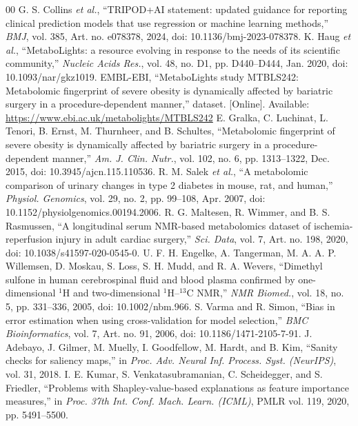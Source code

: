 \documentclass[conference]{IEEEtran}
\begin{document}
\begin{thebibliography}{00}
 G. S. Collins \textit{et al.}, ``TRIPOD+AI statement: updated guidance for reporting clinical prediction models that use regression or machine learning methods,'' \textit{BMJ}, vol. 385, Art. no. e078378, 2024, doi: 10.1136/bmj-2023-078378.
 K. Haug \textit{et al.}, ``MetaboLights: a resource evolving in response to the needs of its scientific community,'' \textit{Nucleic Acids Res.}, vol. 48, no. D1, pp. D440--D444, Jan. 2020, doi: 10.1093/nar/gkz1019.
 EMBL-EBI, ``MetaboLights study MTBLS242: Metabolomic fingerprint of severe obesity is dynamically affected by bariatric surgery in a procedure-dependent manner,'' dataset. [Online]. Available: \url{https://www.ebi.ac.uk/metabolights/MTBLS242}
 E. Gralka, C. Luchinat, L. Tenori, B. Ernst, M. Thurnheer, and B. Schultes, ``Metabolomic fingerprint of severe obesity is dynamically affected by bariatric surgery in a procedure-dependent manner,'' \textit{Am. J. Clin. Nutr.}, vol. 102, no. 6, pp. 1313--1322, Dec. 2015, doi: 10.3945/ajcn.115.110536.
 R. M. Salek \textit{et al.}, ``A metabolomic comparison of urinary changes in type 2 diabetes in mouse, rat, and human,'' \textit{Physiol. Genomics}, vol. 29, no. 2, pp. 99--108, Apr. 2007, doi: 10.1152/physiolgenomics.00194.2006.
 R. G. Maltesen, R. Wimmer, and B. S. Rasmussen, ``A longitudinal serum NMR-based metabolomics dataset of ischemia-reperfusion injury in adult cardiac surgery,'' \textit{Sci. Data}, vol. 7, Art. no. 198, 2020, doi: 10.1038/s41597-020-0545-0.
 U. F. H. Engelke, A. Tangerman, M. A. A. P. Willemsen, D. Moskau, S. Loss, S. H. Mudd, and R. A. Wevers, ``Dimethyl sulfone in human cerebrospinal fluid and blood plasma confirmed by one-dimensional $^1$H and two-dimensional $^1$H--$^{13}$C NMR,'' \textit{NMR Biomed.}, vol. 18, no. 5, pp. 331--336, 2005, doi: 10.1002/nbm.966.
 S. Varma and R. Simon, ``Bias in error estimation when using cross-validation for model selection,'' \textit{BMC Bioinformatics}, vol. 7, Art. no. 91, 2006, doi: 10.1186/1471-2105-7-91.
 J. Adebayo, J. Gilmer, M. Muelly, I. Goodfellow, M. Hardt, and B. Kim, ``Sanity checks for saliency maps,'' in \textit{Proc. Adv. Neural Inf. Process. Syst. (NeurIPS)}, vol. 31, 2018.
 I. E. Kumar, S. Venkatasubramanian, C. Scheidegger, and S. Friedler, ``Problems with Shapley-value-based explanations as feature importance measures,'' in \textit{Proc. 37th Int. Conf. Mach. Learn. (ICML)}, PMLR vol. 119, 2020, pp. 5491--5500.
\end{thebibliography}
\end{document}
